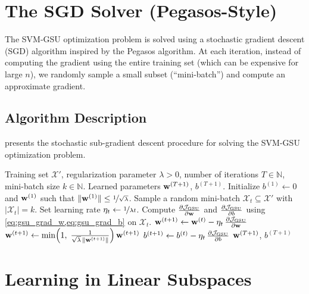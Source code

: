 \documentclass[11pt, letterpaper]{article}
\newcommand{\setX}{\mathcal{X}}
\newcommand{\obj}{\mathcal{J}}
\begin{document}
\section{The SGD Solver (Pegasos-Style)}\label{sec:sgd_solver}

The SVM-GSU optimization problem is solved using a stochastic gradient descent (SGD) algorithm inspired by the Pegasos algorithm. At each iteration, instead of computing the gradient using the entire training set (which can be expensive for large $n$), we randomly sample a small subset (``mini-batch'') and compute an approximate gradient.

\subsection{Algorithm Description}

 presents the stochastic sub-gradient descent procedure for solving the SVM-GSU optimization problem.

\begin{algorithm}[H]
\caption{Stochastic sub-gradient descent for SVM-GSU (Pegasos-style).}
\label{alg:sgd_gsu}
\begin{algorithmic}[1]
\Require Training set $\setX'$, regularization parameter $\lambda > 0$, number of iterations $T \in \mathbb{N}$, mini-batch size $k \in \mathbb{N}$.
\Ensure Learned parameters $\vb{w}^{(T+1)}$, $b^{(T+1)}$.
\State Initialize $b^{(1)} \gets 0$ and $\vb{w}^{(1)}$ such that $\|\vb{w}^{(1)}\| \leq \nicefrac{1}{\sqrt{\lambda}}$.
    \State Sample a random mini-batch $\setX_t \subseteq \setX'$ with $|\setX_t| = k$.
    \State Set learning rate $\eta_t \gets \nicefrac{1}{\lambda t}$.
    \State Compute $\pdv{\obj_{\text{GSU}}}{\vb{w}}$ and $\pdv{\obj_{\text{GSU}}}{b}$ using \cref{eq:gsu_grad_w,eq:gsu_grad_b} on $\setX_t$.
    \State $\vb{w}^{(t+1)} \gets \vb{w}^{(t)} - \eta_t\, \pdv{\obj_{\text{GSU}}}{\vb{w}}$ 
    \State $\vb{w}^{(t+1)} \gets \min\!\left(1,\; \frac{1}{\sqrt{\lambda}\,\|\vb{w}^{(t+1)}\|}\right) \vb{w}^{(t+1)}$ 
    \State $b^{(t+1)} \gets b^{(t)} - \eta_t\, \pdv{\obj_{\text{GSU}}}{b}$ 
\EndFor
\State \Return $\vb{w}^{(T+1)}$, $b^{(T+1)}$
\end{algorithmic}
\end{algorithm}

\section{Learning in Linear Subspaces}\label{sec:subspace}
\end{document}
